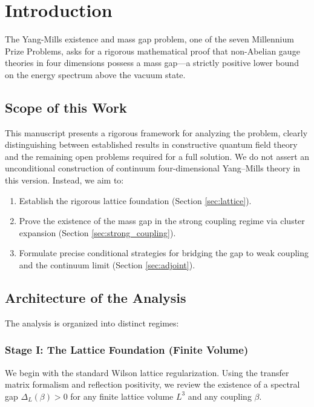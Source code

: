 \section{Introduction}
\label{sec:introduction}

The Yang-Mills existence and mass gap problem, one of the seven Millennium Prize Problems, asks for a rigorous mathematical proof that non-Abelian gauge theories in four dimensions possess a mass gap—a strictly positive lower bound on the energy spectrum above the vacuum state.

\subsection{Scope of this Work}

This manuscript presents a rigorous framework for analyzing the problem, clearly distinguishing between established results in constructive quantum field theory and the remaining open problems required for a full solution.
We do not assert an unconditional construction of continuum four-dimensional Yang--Mills theory in this version. Instead, we aim to:
\begin{enumerate}
    \item Establish the rigorous lattice foundation (Section \ref{sec:lattice}).
    \item Prove the existence of the mass gap in the strong coupling regime via cluster expansion (Section \ref{sec:strong_coupling}).
    \item Formulate precise conditional strategies for bridging the gap to weak coupling and the continuum limit (Section \ref{sec:adjoint}).
\end{enumerate}

\subsection{Architecture of the Analysis}

The analysis is organized into distinct regimes:

\subsubsection*{Stage I: The Lattice Foundation (Finite Volume)}
We begin with the standard Wilson lattice regularization. Using the transfer matrix formalism and reflection positivity, we review the existence of a spectral gap $\Delta_L(\beta) > 0$ for any finite lattice volume $L^3$ and any coupling $\beta$.

